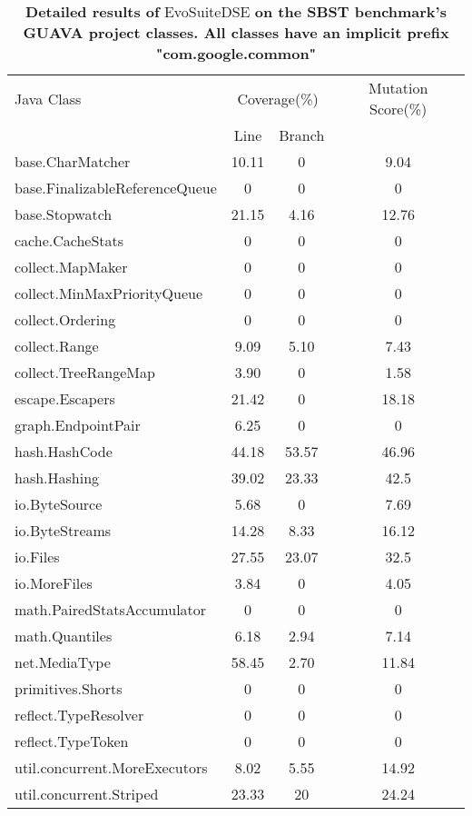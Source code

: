 \documentclass[conference]{IEEEtran}
\begin{document}
\begin{table}[!h]
\renewcommand{\arraystretch}{0.8}
\caption{\textbf{Detailed results of} EvoSuiteDSE \textbf{on the SBST benchmark's GUAVA project classes. All classes have an implicit prefix "com.google.common"}}
\label{table_example}
\centering
\begin{tabular}{lccc}
\hline
Java Class & \multicolumn{2}{c}{Coverage(\%)} & Mutation Score(\%) \\
&Line&Branch&\\
\hline
base.CharMatcher & 10.11 & 0 & 9.04 \\
base.FinalizableReferenceQueue & 0 & 0 & 0 \\
base.Stopwatch & 21.15 & 4.16 & 12.76 \\
cache.CacheStats & 0 & 0 & 0 \\
collect.MapMaker & 0 & 0 & 0 \\
collect.MinMaxPriorityQueue & 0 & 0 & 0 \\
collect.Ordering & 0 & 0 & 0 \\
collect.Range & 9.09 & 5.10 & 7.43 \\
collect.TreeRangeMap & 3.90 & 0 & 1.58 \\
escape.Escapers & 21.42 & 0 & 18.18 \\
graph.EndpointPair & 6.25 & 0 & 0 \\
hash.HashCode & 44.18 & 53.57 & 46.96 \\
hash.Hashing & 39.02 & 23.33 & 42.5 \\
io.ByteSource & 5.68 & 0 & 7.69 \\
io.ByteStreams & 14.28 & 8.33 & 16.12 \\
io.Files & 27.55 & 23.07 & 32.5 \\
io.MoreFiles & 3.84 & 0 & 4.05 \\
math.PairedStatsAccumulator & 0 & 0 & 0 \\
math.Quantiles & 6.18 & 2.94 & 7.14 \\
net.MediaType & 58.45 & 2.70 & 11.84 \\
primitives.Shorts & 0 & 0 & 0 \\
reflect.TypeResolver & 0 & 0 & 0 \\
reflect.TypeToken & 0 & 0 & 0 \\
util.concurrent.MoreExecutors & 8.02 & 5.55 & 14.92 \\
util.concurrent.Striped & 23.33 & 20 & 24.24 \\\end{tabular}
\end{table}
\end{document}
